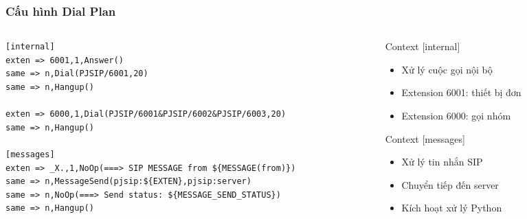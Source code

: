 \begin{frame}[fragile]
\frametitle{Cấu hình Dial Plan}

\begin{columns}[t]
\begin{column}{0.6\textwidth}
\begin{verbatim}
[internal]
exten => 6001,1,Answer()
same => n,Dial(PJSIP/6001,20)
same => n,Hangup()

exten => 6000,1,Dial(PJSIP/6001&PJSIP/6002&PJSIP/6003,20)
same => n,Hangup()

[messages]
exten => _X.,1,NoOp(===> SIP MESSAGE from ${MESSAGE(from)})
same => n,MessageSend(pjsip:${EXTEN},pjsip:server)
same => n,NoOp(===> Send status: ${MESSAGE_SEND_STATUS})
same => n,Hangup()
\end{verbatim}
\end{column}

\begin{column}{0.35\textwidth}
\begin{block}{Context [internal]}
\begin{itemize}
\item Xử lý cuộc gọi nội bộ
\item Extension 6001: thiết bị đơn
\item Extension 6000: gọi nhóm
\end{itemize}
\end{block}

\begin{exampleblock}{Context [messages]}
\begin{itemize}
\item Xử lý tin nhắn SIP
\item Chuyển tiếp đến server
\item Kích hoạt xử lý Python
\end{itemize}
\end{exampleblock}
\end{column}
\end{columns}

\end{frame}

